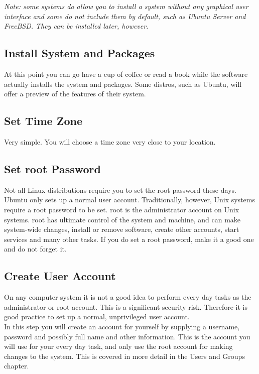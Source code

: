 \textit{Note: some systems do allow you to install a system without any graphical user interface and some do not include them by default, such as Ubuntu Server and FreeBSD.  They can be installed later, however.}

\subsection{Install System and Packages}

At this point you can go have a cup of coffee or read a book while the software actually installs the system and packages.  Some distros, such as Ubuntu, will offer a preview of the features of their system.

\subsection{Set Time Zone}

Very simple.  You will choose a time zone very close to your location.

\subsection{Set root Password}

Not all Linux distributions require you to set the root password these days.  Ubuntu only sets up a normal user account.  Traditionally, however, Unix systems require a root password to be set.  root is the administrator account on Unix systems.  root has ultimate control of the system and machine, and can make system-wide changes, install or remove software, create other accounts, start services and many other tasks.  If you do set a root password, make it a good one and do not forget it.

\subsection{Create User Account}

On any computer system it is not a good idea to perform every day tasks as the administrator or root account.  This is a significant security risk.  Therefore it is good practice to set up a normal, unprivileged user account.\\

In this step you will create an account for yourself by supplying a username, password and possibly full name and other information.  This is the account you will use for your every day task, and only use the root account for making changes to the system.  This is covered in more detail in the Users and Groups chapter.


